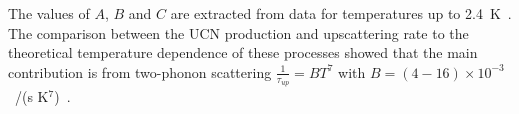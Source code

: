 The values of $A$, $B$ and $C$ are extracted from data for
temperatures up to 2.4~K~\cite{Leung2016}. The comparison between
the UCN production and upscattering rate to the theoretical
temperature dependence of these processes showed that the main
contribution is from two-phonon scattering $\frac{1}{\tau_{up}}=BT^7$
with $B=(4-16)\times 10^{-3}$~/(s K$^7$)~\cite{Leung2016}.











